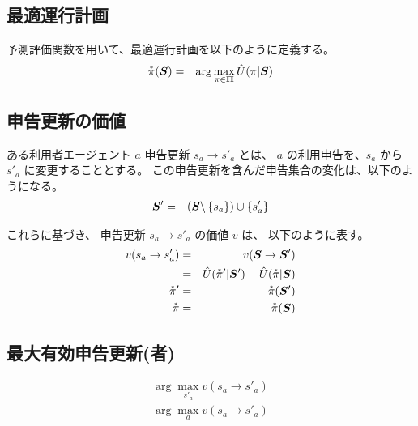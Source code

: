 \subsection{最適運行計画}
予測評価関数を用いて、最適運行計画を以下のように定義する。
  \begin{eqnarray}
    \accentset{*}{\pi}({\bm{S}})
      & = &
        \arg\max_{\pi \in {\bm{\Pi}}} \hat{U}(\pi | {\bm{S}})
  \end{eqnarray}

\subsection{申告更新の価値}
ある利用者エージェント $a$ 申告更新 $s_a \to s'_a$ とは、
$a$ の利用申告を、$s_a$ から $s'_a$ に変更することとする。
この申告更新を含んだ申告集合の変化は、以下のようになる。
  \begin{eqnarray}
    {\bm{S}}' & = & ({\bm{S}} \backslash \left\{ s_a \right\}) \cup\left\{ s'_a \right\}
  \end{eqnarray}

これらに基づき、
申告更新 $s_a \to s'_a$ の価値 $v$ は、
以下のように表す。
  \begin{eqnarray}
    v(s_a \to s'_a) & = & v({\bm{S}} \to {\bm{S}}')
  \\
      & = &
        \hat{U}(\accentset{*}{\pi}' | {\bm{S}}') -
        \hat{U}(\accentset{*}{\pi} | {\bm{S}})
  \\
    \accentset{*}{\pi}' & = & \accentset{*}{\pi}({\bm{S}}')
  \\
    \accentset{*}{\pi} & = & \accentset{*}{\pi}({\bm{S}})
  \end{eqnarray}

\subsection{最大有効申告更新(者)}

  \begin{eqnarray}
    \arg\max_{s'_a} v(s_a \to s'_a)
    \\
    \arg\max_{a} v(s_a \to s'_a)
  \end{eqnarray}



